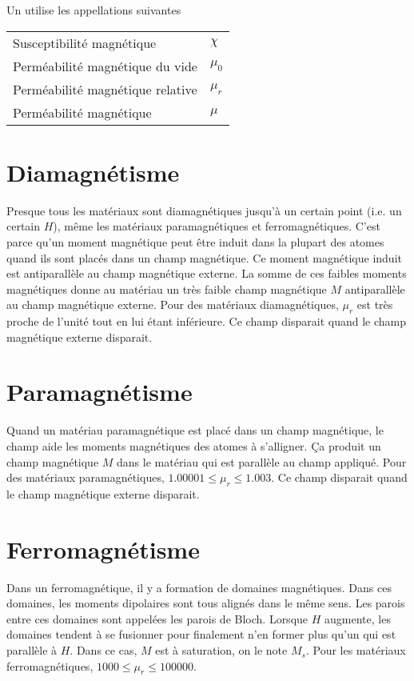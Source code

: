 Un utilise les appellations suivantes
\begin{center}
  \begin{tabular}{ll}
    Susceptibilité magnétique & $\chi$\\
    Perméabilité magnétique du vide & $\mu_0$\\
    Perméabilité magnétique relative & $\mu_r$\\
    Perméabilité magnétique & $\mu$
  \end{tabular}
\end{center}

\section{Diamagnétisme}
Presque tous les matériaux sont diamagnétiques jusqu'à un certain point
(i.e. un certain $H$), même les matériaux paramagnétiques et ferromagnétiques.
C'est parce qu'un moment magnétique peut être induit dans la plupart
des atomes quand ils sont placés dans un champ magnétique.
Ce moment magnétique induit est antiparallèle au champ magnétique externe.
La somme de ces faibles moments magnétiques donne au matériau
un très faible champ magnétique $M$ antiparallèle au champ magnétique externe.
Pour des matériaux diamagnétiques, $\mu_r$ est très proche de l'unité tout en
lui étant inférieure.
Ce champ disparait quand le champ magnétique externe disparait.


\section{Paramagnétisme}
Quand un matériau paramagnétique est placé dans un champ magnétique,
le champ aide les moments magnétiques des atomes à s'alligner.
Ça produit un champ magnétique $M$ dans le matériau
qui est parallèle au champ appliqué. Pour des matériaux paramagnétiques,
$1.00001 \leq \mu_r \leq 1.003$.
Ce champ disparait quand le champ magnétique externe disparait.

\section{Ferromagnétisme}
\label{sec:ferro}
Dans un ferromagnétique, il y a formation de domaines magnétiques.
Dans ces domaines, les moments dipolaires sont tous alignés dans le même sens.
Les parois entre ces domaines sont appelées les parois de Bloch.
Lorsque $H$ augmente,
les domaines tendent à se fusionner pour finalement
n'en former plus qu'un qui est parallèle à $H$.
Dans ce cas, $M$ est à saturation, on le note $M_s$.
Pour les matériaux ferromagnétiques, $1000 \leq \mu_r \leq 100000$.

